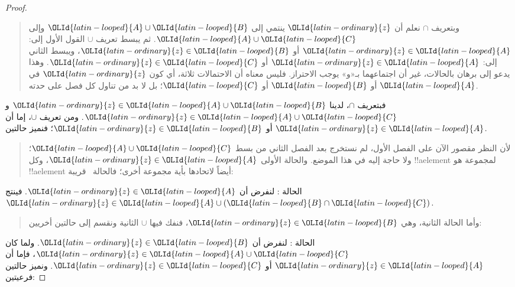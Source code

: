 \documentclass[../../../include/open-logic-section]{subfiles}
\begin{document}
\begin{proof}
\begin{quote}
وبتعريف $\cap$ نعلم أن ${\OLId{latin-ordinary}{z}}$ ينتمي إلى ${\OLId{latin-looped}{A}} \cup {\OLId{latin-looped}{B}}$ وإلى
${\OLId{latin-looped}{A}} \cup {\OLId{latin-looped}{C}}$. ثم يبسط تعريف $\cup$ القول الأول إلى: ${\OLId{latin-ordinary}{z}} \in {\OLId{latin-looped}{A}}$ أو
${\OLId{latin-ordinary}{z}} \in {\OLId{latin-looped}{B}}$، ويبسط الثاني إلى: ${\OLId{latin-ordinary}{z}} \in {\OLId{latin-looped}{A}}$ أو ${\OLId{latin-ordinary}{z}} \in {\OLId{latin-looped}{C}}$.
وهذا يدعو إلى برهان بالحالات، غير أن اجتماعهما بـ«و» يوجب الاحتراز.
فليس معناه أن الاحتمالات ثلاثة، أي كون ${\OLId{latin-ordinary}{z}}$ في ${\OLId{latin-looped}{A}}$ أو ${\OLId{latin-looped}{B}}$ أو ${\OLId{latin-looped}{C}}$؛ بل
لا بد من تناول كل فصل على حدته.
\end{quote}
فبتعريف $\cap$، لدينا ${\OLId{latin-ordinary}{z}} \in {\OLId{latin-looped}{A}} \cup {\OLId{latin-looped}{B}}$ و${\OLId{latin-ordinary}{z}} \in {\OLId{latin-looped}{A}} \cup {\OLId{latin-looped}{C}}$. ومن
تعريف $\cup$، إما أن ${\OLId{latin-ordinary}{z}} \in {\OLId{latin-looped}{A}}$ أو ${\OLId{latin-ordinary}{z}} \in {\OLId{latin-looped}{B}}$؛ فنميز حالتين.
\begin{quote}
لأن النظر مقصور الآن على الفصل الأول، لم نستخرج بعد الفصل الثاني من
بسط ${\OLId{latin-looped}{A}} \cup {\OLId{latin-looped}{C}}$؛ ولا حاجة إليه في هذا الموضع. والحالة الأولى
${\OLId{latin-ordinary}{z}} \in {\OLId{latin-looped}{A}}$، وكل !!a{element} لمجموعة هو !!a{element} أيضاً لاتحادها
بأية مجموعة أخرى؛ فالحالة~ قريبة:
\end{quote}
الحالة : لنفرض أن ${\OLId{latin-ordinary}{z}} \in {\OLId{latin-looped}{A}}$. فينتج ${\OLId{latin-ordinary}{z}} \in {\OLId{latin-looped}{A}} \cup ({\OLId{latin-looped}{B}} \cap {\OLId{latin-looped}{C}})$.
\begin{quote}
وأما الحالة الثانية، وهي ${\OLId{latin-ordinary}{z}} \in {\OLId{latin-looped}{B}}$، فنفك فيها $\cup$ الثانية ونقسم
إلى حالتين أخريين:
\end{quote}
الحالة : لنفرض أن ${\OLId{latin-ordinary}{z}} \in {\OLId{latin-looped}{B}}$. ولما كان ${\OLId{latin-ordinary}{z}} \in {\OLId{latin-looped}{A}} \cup {\OLId{latin-looped}{C}}$، فإما أن
${\OLId{latin-ordinary}{z}} \in {\OLId{latin-looped}{A}}$ أو ${\OLId{latin-ordinary}{z}} \in {\OLId{latin-looped}{C}}$. ونميز حالتين فرعيتين:


\end{proof}
\end{document}
